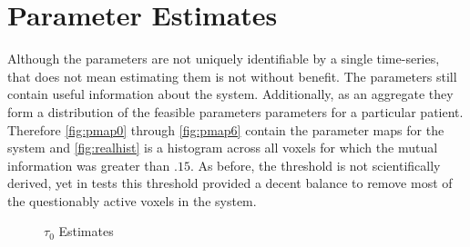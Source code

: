 \section{Parameter Estimates}
Although the parameters are not uniquely identifiable by a single time-series, that
does not mean estimating them is not without benefit. The parameters still contain useful
information about the system. Additionally, as an aggregate they form a distribution of
the feasible parameters parameters for a particular patient. Therefore 
\autoref{fig:pmap0} through \autoref{fig:pmap6}
contain the parameter maps for the system and \autoref{fig:realhist} is a histogram across all voxels
for which the mutual information was greater than $.15$. As before, the threshold is not
scientifically derived, yet in tests this threshold provided a decent balance to remove most
of the questionably active voxels in the system. 

\begin{figure}[H]
\centering
{}
\caption{$\tau_0$ Estimates}
\label{fig:pmap0}
\end{figure}

